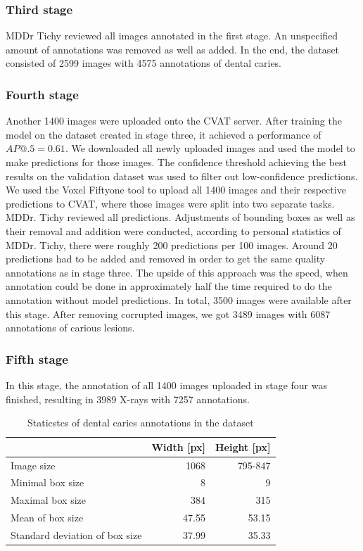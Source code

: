 \subsubsection{Third stage}
MDDr Tichy reviewed all images annotated in the first stage. An unspecified amount of annotations was removed as well as added. In the end, the dataset consisted of 2599 images with 4575 annotations of dental caries.

\subsubsection{Fourth stage}
Another 1400 images were uploaded onto the CVAT server. After training the model on the dataset created in stage three, it achieved a performance of $AP@.5=0.61$. We downloaded all newly uploaded images and used the model to make predictions for those images. The confidence threshold achieving the best results on the validation dataset was used to filter out low-confidence predictions. We used the Voxel Fiftyone tool to upload all 1400 images and their respective predictions to CVAT, where those images were split into two separate tasks.
MDDr. Tichy reviewed all predictions. Adjustments of bounding boxes as well as their removal and addition were conducted, according to personal statistics of MDDr. Tichy, there were roughly 200 predictions per 100 images. Around 20 predictions had to be added and removed in order to get the same quality annotations as in stage three. The upside of this approach was the speed, when annotation could be done in approximately half the time required to do the annotation without model predictions. In total, 3500 images were available after this stage. After removing corrupted images, we got 3489 images with 6087 annotations of carious lesions.

\subsubsection{Fifth stage}
In this stage, the annotation of all 1400 images uploaded in stage four was finished, resulting in 3989 X-rays with 7257 annotations.

\begin{table}
    \centering
    \begin{tabular}{l|r|r}
                                       & Width [px] & Height [px] \\\hline
        Image size                     & 1068       & 795-847     \\ \hline
        Minimal box size               & 8          & 9           \\ \hline
        Maximal box size               & 384        & 315         \\ \hline
        Mean of box size               & 47.55      & 53.15       \\ \hline
        Standard deviation of box size & 37.99      & 35.33       \\ \hline
    \end{tabular}
    \caption{\label{tab:dataset_statistics}Staticstcs of dental caries annotations in the dataset}
\end{table}

